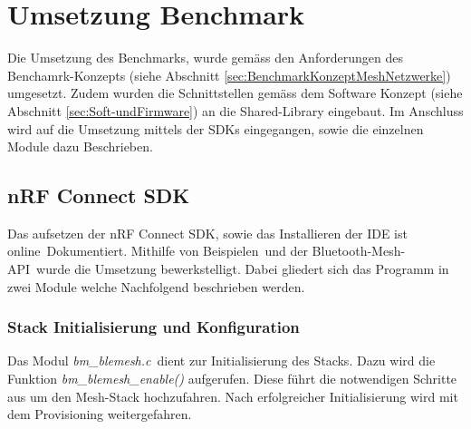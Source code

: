 \clearpage
\section{Umsetzung Benchmark}\label{sec:BTMeshUmsetzungBenchmark}

Die Umsetzung des Benchmarks, wurde gemäss den Anforderungen des Benchamrk-Konzepts (siehe Abschnitt \ref{sec:BenchmarkKonzeptMeshNetzwerke}) umgesetzt. Zudem wurden die Schnittstellen gemäss dem Software Konzept (siehe Abschnitt \ref{sec:Soft-undFirmware}) an die Shared-Library eingebaut. Im Anschluss wird auf die Umsetzung mittels der SDKs eingegangen, sowie die einzelnen Module dazu Beschrieben. 

\subsection{nRF Connect SDK}\label{subsec:BluetoothMeshUmsetzungnRFConnectSDK} 

Das aufsetzen der nRF Connect SDK, sowie das Installieren der IDE ist online\footnotemark\ Dokumentiert. Mithilfe von Beispielen\footnotemark\ und der Bluetooth-Mesh-API\footnotemark\ wurde die Umsetzung bewerkstelligt. Dabei gliedert sich das Programm in zwei Module welche Nachfolgend beschrieben werden.




\subsubsection{Stack Initialisierung und Konfiguration}\label{subsubsec:BluetoothMeshUmsetzungnRFConnectSDKInitandConfig} 

Das Modul \textit{bm\_blemesh.c}\footnotemark\ dient zur Initialisierung des Stacks. Dazu wird die Funktion \linebreak\textit{bm\_blemesh\_enable()} aufgerufen. Diese führt die notwendigen Schritte aus um den Mesh-Stack hochzufahren. Nach erfolgreicher Initialisierung wird mit dem Provisioning weitergefahren. \\




